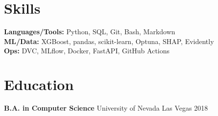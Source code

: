 \documentclass[a4paper,10pt]{article}
\begin{document}
\section*{Skills}

\textbf{Languages/Tools:} Python, SQL, Git, Bash, Markdown \\
\textbf{ML/Data:} XGBoost, pandas, scikit-learn, Optuna, SHAP, Evidently \\
\textbf{Ops:} DVC, MLflow, Docker, FastAPI, GitHub Actions

\section*{Education}

\textbf{B.A. in Computer Science} \hfill University of Nevada Las Vegas \hfill 2018
\end{document}
